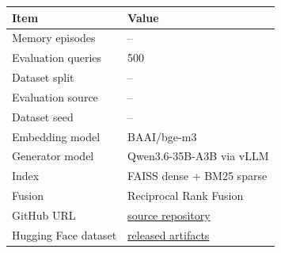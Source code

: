 \begin{tabular}{ll}
\toprule
Item & Value \\
\midrule
Memory episodes & -- \\
Evaluation queries & 500 \\
Dataset split & -- \\
Evaluation source & -- \\
Dataset seed & -- \\
Embedding model & BAAI/bge-m3 \\
Generator model & Qwen3.6-35B-A3B via vLLM \\
Index & FAISS dense + BM25 sparse \\
Fusion & Reciprocal Rank Fusion \\
GitHub URL & \href{https://github.com/Salomondiei08/sqe-experiment}{source repository} \\
Hugging Face dataset & \href{https://huggingface.co/datasets/TheReinventGuy/sqe-experiment}{released artifacts} \\
\bottomrule
\end{tabular}
